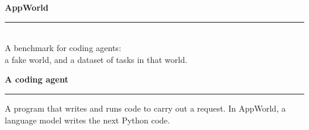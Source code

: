 \documentclass[aspectratio=169,11pt]{beamer}
\begin{document}
\begin{frame}
\vspace*{\fill}
\begin{center}
  {\Huge\bfseries\color{deepblue} AppWorld}\\[8pt]
  {\color{accent}\rule{0.32\linewidth}{1.2pt}}\\[10pt]
  {\large A benchmark for coding agents:\\[4pt]
  a fake world, and a dataset of tasks in that world.}
\end{center}
\vspace*{\fill}
\end{frame}

\begin{frame}
\begin{center}
  {\Large\bfseries\color{deepblue} A coding agent}\\[2pt]
  {\color{accent}\rule{0.28\linewidth}{1.1pt}}
\end{center}

\vspace{0.4em}
\begin{plainbox}
A program that writes and runs code to carry out a request. In AppWorld, a language model writes the next Python code.
\end{plainbox}
\end{frame}
\end{document}
